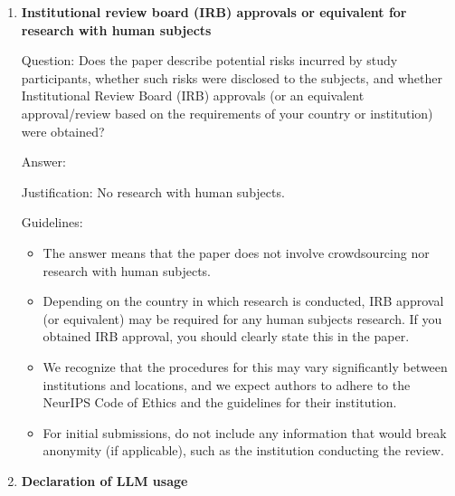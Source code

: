 \documentclass[
]{article}
\begin{document}
\begin{enumerate}
  Question: For crowdsourcing experiments and research with human
  subjects, does the paper include the full text of instructions given
  to participants and screenshots, if applicable, as well as details
  about compensation (if any)?

  Answer: \answerNA{}

  Justification: No crowdsourcing and no human subjects.

  Guidelines:

  \begin{itemize}
  \item
    The answer \answerNA{} means that the paper does not involve
    crowdsourcing nor research with human subjects.
  \item
    Including this information in the supplemental material is fine, but
    if the main contribution of the paper involves human subjects, then
    as much detail as possible should be included in the main paper.
  \item
    According to the NeurIPS Code of Ethics, workers involved in data
    collection, curation, or other labor should be paid at least the
    minimum wage in the country of the data collector.
  \end{itemize}
\item
  \textbf{Institutional review board (IRB) approvals or equivalent for
  research with human subjects}

  Question: Does the paper describe potential risks incurred by study
  participants, whether such risks were disclosed to the subjects, and
  whether Institutional Review Board (IRB) approvals (or an equivalent
  approval/review based on the requirements of your country or
  institution) were obtained?

  Answer: \answerNA{}

  Justification: No research with human subjects.

  Guidelines:

  \begin{itemize}
  \item
    The answer \answerNA{} means that the paper does not involve
    crowdsourcing nor research with human subjects.
  \item
    Depending on the country in which research is conducted, IRB
    approval (or equivalent) may be required for any human subjects
    research. If you obtained IRB approval, you should clearly state
    this in the paper.
  \item
    We recognize that the procedures for this may vary significantly
    between institutions and locations, and we expect authors to adhere
    to the NeurIPS Code of Ethics and the guidelines for their
    institution.
  \item
    For initial submissions, do not include any information that would
    break anonymity (if applicable), such as the institution conducting
    the review.
  \end{itemize}
\item
  \textbf{Declaration of LLM usage}


\end{enumerate}
\end{document}
